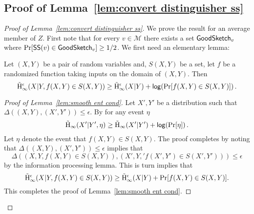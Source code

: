 \subsection{Proof of Lemma~\ref{lem:convert distinguisher ss}}
\label{ssec:ss proof}
\begin{proof}[Proof of Lemma~\ref{lem:convert distinguisher ss}]
We prove the result for an average member of $Z$.  First note that for every $v\in \mathcal{M}$ there exists a set $\mathsf{GoodSketch}_v$ where $\Pr[{\mathsf{SS}}(v)\in \mathsf{GoodSketch}_v] \ge 1/2$.  We first need an elementary lemma: 
\begin{lemma}
Let $(X, Y)$ be a pair of random variables and, $S(X, Y)$ be a set, let $f$ be a randomized function taking inputs on the domain of $(X, Y)$. Then 
\[
\tilde{\mathrm{H}}_\infty^\epsilon(X|Y, f(X, Y) \in S(X, Y))\ge \tilde{\mathrm{H}}_\infty^\epsilon(X|Y) + \mathsf{log}\!\left( \Pr[f(X, Y) \in S(X, Y)]\right).
\]
\label{lem:smooth ent cond}
\end{lemma}
\begin{proof}[Proof of Lemma~\ref{lem:smooth ent cond}]
Let $X', Y'$ be a distribution such that $\Delta((X, Y), (X', Y')) \le \epsilon$.  By \cite[Lemma 7.8]{fuller2020fuzzy} for any event $\eta$
\begin{align*}
\tilde{\mathrm{H}}_\infty(X'| Y', \eta) \ge \tilde{\mathrm{H}}_\infty(X' | Y') +\mathsf{log}\!\left(\Pr[\eta]\right).
\end{align*}
Let $\eta$ denote the event that $f(X, Y) \in S(X, Y)$.
The proof completes by noting that $\Delta((X, Y), (X', Y'))\le \epsilon$ implies that 
\[
\Delta((X, Y, f(X, Y) \in S(X, Y)), (X', Y,' f(X', Y')\in S(X', Y')))\le \epsilon\] by the information processing lemma. This is turn implies that 
\[
\tilde{\mathrm{H}}_\infty^\epsilon(X|Y, f(X, Y) \in S(X, Y))\ge \tilde{\mathrm{H}}_\infty^\epsilon(X|Y) +\Pr[f(X, Y) \in S(X, Y)].
\]
This completes the proof of Lemma~\ref{lem:smooth ent cond}.
\end{proof}


\end{proof}
